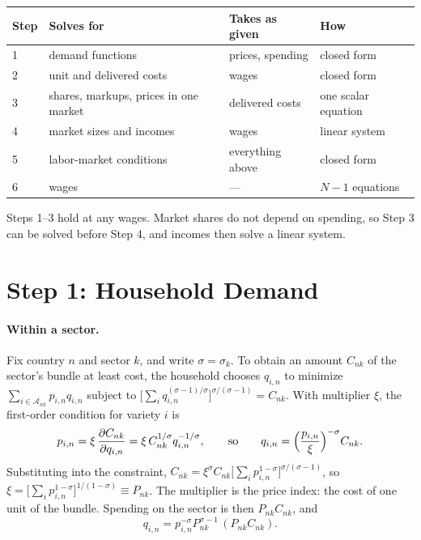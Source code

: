 \documentclass[11pt]{article}
\newcommand{\cA}{\mathcal A}
\begin{document}
\begin{center}
\small
\begin{tabular}{@{}llll@{}}
\toprule
Step & Solves for & Takes as given & How \\
\midrule
1 & demand functions & prices, spending & closed form \\
2 & unit and delivered costs & wages & closed form \\
3 & shares, markups, prices in one market & delivered costs & one scalar equation \\
4 & market sizes and incomes & wages & linear system \\
5 & labor-market conditions & everything above & closed form \\
6 & wages & --- & $N-1$ equations \\
\bottomrule
\end{tabular}
\end{center}

\noindent Steps 1--3 hold at any wages. Market shares do not depend on spending, so
Step 3 can be solved before Step 4, and incomes then solve a linear system.

\section{Step 1: Household Demand}
\label{sec:demand}

\paragraph{Within a sector.} Fix country $n$ and sector $k$, and write $\sigma=\sigma_k$.
To obtain an amount $C_{nk}$ of the sector's bundle at least cost, the household
chooses $q_{i,n}$ to minimize $\sum_{i\in\cA_{nk}}p_{i,n}q_{i,n}$ subject to
$\bigl[\sum_iq_{i,n}^{(\sigma-1)/\sigma}\bigr]^{\sigma/(\sigma-1)}=C_{nk}$. With
multiplier $\xi$, the first-order condition for variety $i$ is
\[
  p_{i,n}=\xi\,\frac{\partial C_{nk}}{\partial q_{i,n}}
  =\xi\,C_{nk}^{1/\sigma}q_{i,n}^{-1/\sigma},
  \qquad\text{so}\qquad
  q_{i,n}=\Bigl(\frac{p_{i,n}}{\xi}\Bigr)^{-\sigma}C_{nk}.
\]
Substituting into the constraint,
$C_{nk}=\xi^{\sigma}C_{nk}\bigl[\sum_ip_{i,n}^{1-\sigma}\bigr]^{\sigma/(\sigma-1)}$,
so $\xi=\bigl[\sum_ip_{i,n}^{1-\sigma}\bigr]^{1/(1-\sigma)}\equiv P_{nk}$. The
multiplier is the price index: the cost of one unit of the bundle. Spending on the
sector is then $P_{nk}C_{nk}$, and
\begin{equation}
  q_{i,n}=p_{i,n}^{-\sigma}P_{nk}^{\sigma-1}\,(P_{nk}C_{nk}).
  \label{eq:lowertier}
\end{equation}
\end{document}

